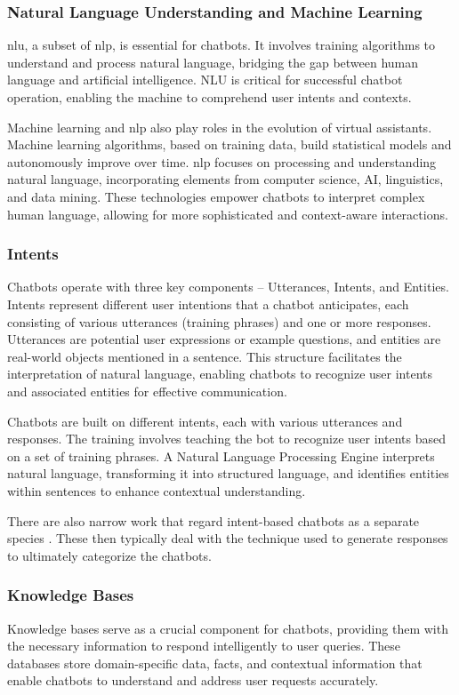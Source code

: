 \subsubsection{Natural Language Understanding and Machine Learning}
\gls{nlu}, a subset of \gls{nlp}, is essential for chatbots.
It involves training algorithms to understand and process natural language, bridging the gap between human language and artificial intelligence. 
NLU is critical for successful chatbot operation, enabling the machine to comprehend user intents and contexts.

Machine learning and \gls{nlp} also play roles in the evolution of virtual assistants. 
Machine learning algorithms, based on training data, build statistical models and autonomously improve over time.
\gls{nlp} focuses on processing and understanding natural language, incorporating elements from computer science, AI, linguistics, and data mining. 
These technologies empower chatbots to interpret complex human language, allowing for more sophisticated and context-aware interactions.

\subsubsection{Intents}
Chatbots operate with three key components – Utterances, Intents, and Entities. Intents represent different user intentions that a chatbot anticipates, each consisting of various utterances (training phrases) and one or more responses. Utterances are potential user expressions or example questions, and entities are real-world objects mentioned in a sentence. This structure facilitates the interpretation of natural language, enabling chatbots to recognize user intents and associated entities for effective communication.

Chatbots are built on different intents, each with various utterances and responses. 
The training involves teaching the bot to recognize user intents based on a set of training phrases. 
A Natural Language Processing Engine interprets natural language, transforming it into structured language, and identifies entities within sentences to enhance contextual understanding.

There are also narrow work that regard intent-based chatbots as a separate species \cite{luo_critical_2022}. 
These then typically deal with the technique used to generate responses to ultimately categorize the chatbots.

\subsubsection{Knowledge Bases}
Knowledge bases serve as a crucial component for chatbots, providing them with the necessary information to respond intelligently to user queries. 
These databases store domain-specific data, facts, and contextual information that enable chatbots to understand and address user requests accurately.

